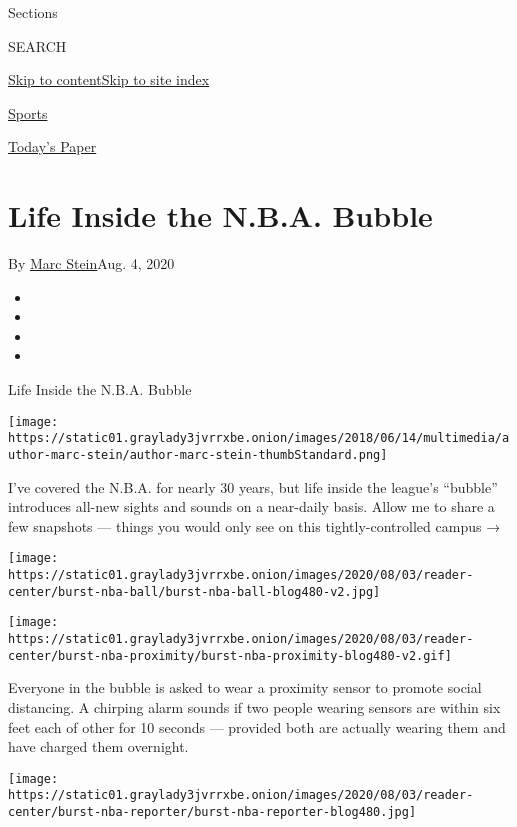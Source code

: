 Sections

SEARCH

\protect\hyperlink{site-content}{Skip to
content}\protect\hyperlink{site-index}{Skip to site index}

\href{https://www.nytimes3xbfgragh.onion/section/sports}{Sports}

\href{https://myaccount.nytimes3xbfgragh.onion/auth/login?response_type=cookie\&client_id=vi}{}

\href{https://www.nytimes3xbfgragh.onion/section/todayspaper}{Today's
Paper}

\hypertarget{life-inside-the-nba-bubble}{%
\section{Life Inside the N.B.A.
Bubble}\label{life-inside-the-nba-bubble}}

By \href{https://www.nytimes3xbfgragh.onion/by/marc-stein}{Marc
Stein}Aug. 4, 2020

\begin{itemize}
\item
\item
\item
\item
\end{itemize}

Life Inside the N.B.A. Bubble

\texttt{[image: https://static01.graylady3jvrrxbe.onion/images/2018/06/14/multimedia/author-marc-stein/author-marc-stein-thumbStandard.png]}

I've covered the N.B.A. for nearly 30 years, but life inside the
league's ``bubble'' introduces all-new sights and sounds on a near-daily
basis. Allow me to share a few snapshots --- things you would only see
on this tightly-controlled campus →

\texttt{[image: https://static01.graylady3jvrrxbe.onion/images/2020/08/03/reader-center/burst-nba-ball/burst-nba-ball-blog480-v2.jpg]}

\texttt{[image: https://static01.graylady3jvrrxbe.onion/images/2020/08/03/reader-center/burst-nba-proximity/burst-nba-proximity-blog480-v2.gif]}

Everyone in the bubble is asked to wear a proximity sensor to promote
social distancing. A chirping alarm sounds if two people wearing sensors
are within six feet each of other for 10 seconds --- provided both are
actually wearing them and have charged them overnight.

\texttt{[image: https://static01.graylady3jvrrxbe.onion/images/2020/08/03/reader-center/burst-nba-reporter/burst-nba-reporter-blog480.jpg]}

